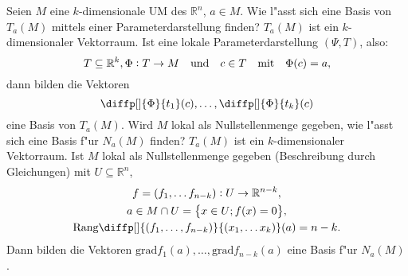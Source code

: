 \documentclass[9pt]{article}
\newenvironment{field}{}{\newpage}
\newif\ifnote
\newenvironment{note}{\notetrue}{\notefalse}
\newcommand{\localtag}{}
\newcommand{\globaltag}{}
\newcommand{\uuid}{}
\newcommand{\tags}[1]{
    \ifnote 
        \renewcommand{\localtag}{#1}
    \else
        \renewcommand{\globaltag}{#1}
    \fi 
    }
\newcommand{\xplain}[1]{\renewcommand{\uuid}{#1}}
\begin{document}
\begin{note}
		\xplain{f54d3b26-2bb6-4cb0-a2ec-986f52924e47}
		\tags{satz, tangentialraum, 1.2.2}
		\begin{field}
			Seien $M$ eine $k$-dimensionale UM des $\mathbb{R}^n$, $a\in M$. Wie l"asst sich eine Basis von $T_a(M)$ mittels einer Parameterdarstellung finden? 
		\end{field}
		\begin{field}
			$T_a(M)$ ist ein $k$-dimensionaler Vektorraum. Ist eine lokale Parameterdarstellung $(\Psi, T)$, also:
			\begin{equation*}
				T\subseteq \mathbb{R}^k, \Phi : T \rightarrow M \qq{und} c\in T \qq{mit} \Phi(c) = a,
			\end{equation*}	
			dann bilden die Vektoren
			\begin{equation*}
				\diffp[]{\Phi}{t_1}(c), \dots, \diffp[]{\Phi}{t_k}(c)
			\end{equation*}
			eine Basis von $T_a(M)$.
		\end{field}
		\begin{field}
			Wird $M$ lokal als Nullstellenmenge gegeben, wie l"asst sich eine Basis f"ur $N_a(M)$ finden?
		\end{field}
		\begin{field}
				$T_a(M)$ ist ein $k$-dimensionaler Vektorraum. Ist $M$ lokal als Nullstellenmenge gegeben (Beschreibung durch Gleichungen) mit $U\subseteq \mathbb{R}^n$,
			\begin{gather*}
				f = \qty(f_1,\dots f_{n-k}) : U \rightarrow \mathbb{R}^{n-k}, \\
				a \in M \cap U = \qty{x \in U; f(x) = 0}, \\
				\text{Rang}\diffp[]{(f_1,\dots,f_{n-k})}{(x_1,\dots x_k)}(a) = n-k. \\
			\end{gather*}
			Dann bilden die Vektoren $\text{grad}f_1(a),\dots,\text{grad}f_{n-k}(a)$ eine Basis f"ur $N_a(M)$.
		\end{field}
\end{note}

\end{document}
